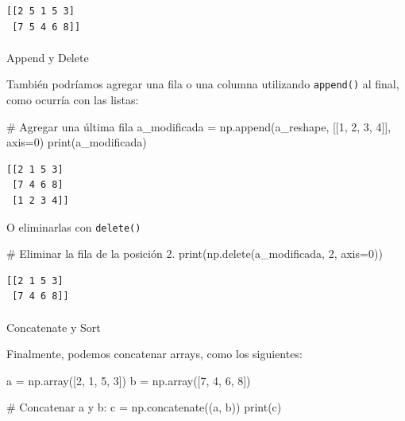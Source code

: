 \documentclass[
  letterpaper,
  DIV=11,
  numbers=noendperiod]{scrreprt}
\makeatletter
\let\oldparagraph\paragraph
\renewcommand{\paragraph}{
    \@ifstar
      \xxxParagraphStar
      \xxxParagraphNoStar
  }
\newcommand{\xxxParagraphStar}[1]{\oldparagraph*{#1}\mbox{}}
\newcommand{\xxxParagraphNoStar}[1]{\oldparagraph{#1}\mbox{}}
\newenvironment{Shaded}{\begin{snugshade}}{\end{snugshade}}
\newcommand{\BuiltInTok}[1]{\textcolor[rgb]{0.00,0.23,0.31}{#1}}
\newcommand{\CommentTok}[1]{\textcolor[rgb]{0.37,0.37,0.37}{#1}}
\newcommand{\DecValTok}[1]{\textcolor[rgb]{0.68,0.00,0.00}{#1}}
\newcommand{\NormalTok}[1]{\textcolor[rgb]{0.00,0.23,0.31}{#1}}
\newcommand{\OperatorTok}[1]{\textcolor[rgb]{0.37,0.37,0.37}{#1}}
\makeatother
\begin{document}
\begin{verbatim}
[[2 5 1 5 3]
 [7 5 4 6 8]]
\end{verbatim}

\paragraph{Append y Delete}\label{append-y-delete}

También podríamos agregar una fila o una columna utilizando
\texttt{append()} al final, como ocurría con las listas:

\begin{Shaded}
\begin{Highlighting}[]
\CommentTok{\# Agregar una última fila}
\NormalTok{a\_modificada }\OperatorTok{=}\NormalTok{ np.append(a\_reshape, [[}\DecValTok{1}\NormalTok{, }\DecValTok{2}\NormalTok{, }\DecValTok{3}\NormalTok{, }\DecValTok{4}\NormalTok{]], axis}\OperatorTok{=}\DecValTok{0}\NormalTok{)}
\BuiltInTok{print}\NormalTok{(a\_modificada)}
\end{Highlighting}
\end{Shaded}

\begin{verbatim}
[[2 1 5 3]
 [7 4 6 8]
 [1 2 3 4]]
\end{verbatim}

O eliminarlas con \texttt{delete()}

\begin{Shaded}
\begin{Highlighting}[]
\CommentTok{\# Eliminar la fila de la posición 2.}
\BuiltInTok{print}\NormalTok{(np.delete(a\_modificada, }\DecValTok{2}\NormalTok{, axis}\OperatorTok{=}\DecValTok{0}\NormalTok{))}
\end{Highlighting}
\end{Shaded}

\begin{verbatim}
[[2 1 5 3]
 [7 4 6 8]]
\end{verbatim}

\paragraph{Concatenate y Sort}\label{concatenate-y-sort}

Finalmente, podemos concatenar arrays, como los siguientes:

\begin{Shaded}
\begin{Highlighting}[]
\NormalTok{a }\OperatorTok{=}\NormalTok{ np.array([}\DecValTok{2}\NormalTok{, }\DecValTok{1}\NormalTok{, }\DecValTok{5}\NormalTok{, }\DecValTok{3}\NormalTok{])}
\NormalTok{b }\OperatorTok{=}\NormalTok{ np.array([}\DecValTok{7}\NormalTok{, }\DecValTok{4}\NormalTok{, }\DecValTok{6}\NormalTok{, }\DecValTok{8}\NormalTok{])}

\CommentTok{\# Concatenar a y b:}
\NormalTok{c }\OperatorTok{=}\NormalTok{ np.concatenate((a, b))}
\BuiltInTok{print}\NormalTok{(c)}
\end{Highlighting}
\end{Shaded}
\end{document}
